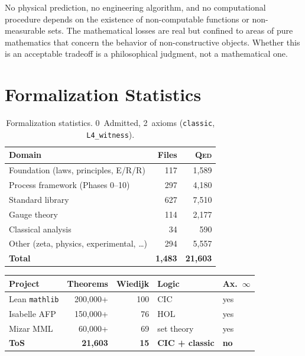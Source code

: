 \documentclass[11pt,a4paper]{article}
\theoremstyle{definition}
\theoremstyle{remark}
\newcommand{\Qed}{\textsc{Qed}}
\begin{document}
No physical prediction, no engineering algorithm, and no computational procedure depends on the existence of non-computable functions or non-measurable sets.  The mathematical losses are real but confined to areas of pure mathematics that concern the behavior of non-constructive objects.  Whether this is an acceptable tradeoff is a philosophical judgment, not a mathematical one.


\section{Formalization Statistics}
\label{sec:stats}

\begin{table}[h]
\centering
\small
\begin{tabular}{@{}lrr@{}}
\toprule
Domain & Files & \Qed \\
\midrule
Foundation (laws, principles, E/R/R) & 117 & 1,589 \\
Process framework (Phases 0--10) & 297 & 4,180 \\
Standard library & 627 & 7,510 \\
Gauge theory & 114 & 2,177 \\
Classical analysis & 34 & 590 \\
Other (zeta, physics, experimental, \ldots) & 294 & 5,557 \\
\midrule
\textbf{Total} & \textbf{1,483} & \textbf{21,603} \\
\bottomrule
\end{tabular}
\caption{Formalization statistics.  0~Admitted, 2~axioms (\texttt{classic}, \texttt{L4\_witness}).}
\label{tab:stats}
\end{table}

\begin{center}
\small
\begin{tabular}{@{}lrrll@{}}
\toprule
Project & Theorems & Wiedijk & Logic & Ax.\ $\infty$ \\
\midrule
Lean \texttt{mathlib} & 200,000+ & 100 & CIC & yes \\
Isabelle AFP & 150,000+ & 76 & HOL & yes \\
Mizar MML & 60,000+ & 69 & set theory & yes \\
\textbf{ToS} & \textbf{21,603} & \textbf{15} & \textbf{CIC + classic} & \textbf{no} \\
\bottomrule
\end{tabular}
\end{center}
\end{document}
